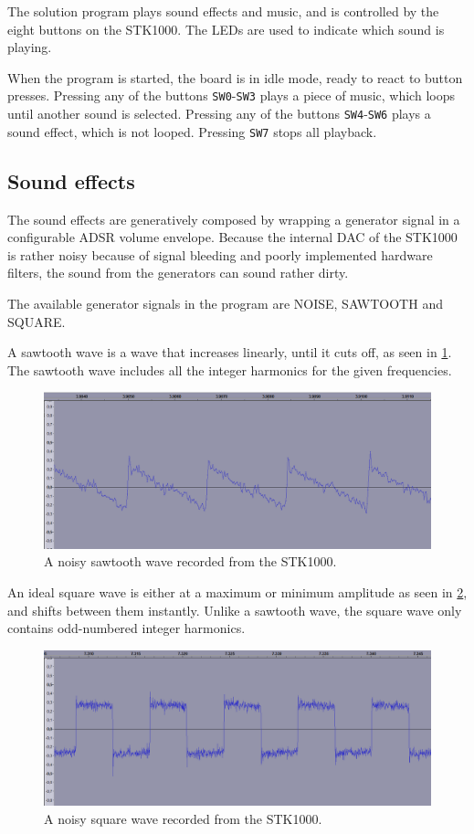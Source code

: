 The solution program plays sound effects and music, and is controlled by the eight buttons on the STK1000.
The LEDs are used to indicate which sound is playing.

When the program is started, the board is in idle mode, ready to react to button presses.
Pressing any of the buttons \texttt{SW0}-\texttt{SW3} plays a piece of music, which loops until another sound is selected.
Pressing any of the buttons \texttt{SW4}-\texttt{SW6} plays a sound effect, which is not looped.
Pressing \texttt{SW7} stops all playback.

\subsection{Sound effects}

The sound effects are generatively composed by wrapping a generator signal in a configurable ADSR volume envelope.
Because the internal DAC of the STK1000 is rather noisy because of signal bleeding and poorly implemented hardware filters, the sound from the generators can sound rather dirty.

The available generator signals in the program are NOISE, SAWTOOTH and SQUARE.

A sawtooth wave is a wave that increases linearly, until it cuts off, as seen in \ref{img-sw5zoom}.
The sawtooth wave includes all the integer harmonics for the given frequencies.
\begin{figure}[H]
	\includegraphics[width = \textwidth]{images/SW5zoom.png}
	\caption{A noisy sawtooth wave recorded from the STK1000.}
	\label{img-sw5zoom}
\end{figure}

An ideal square wave is either at a maximum or minimum amplitude as seen in \ref{img-sw4zoom}, and shifts between them instantly.
Unlike a sawtooth wave, the square wave only contains odd-numbered integer harmonics.
\begin{figure}[H]
	\includegraphics[width = \textwidth]{images/SW4zoom.png}
	\caption{A noisy square wave recorded from the STK1000.}
	\label{img-sw4zoom}
\end{figure}

